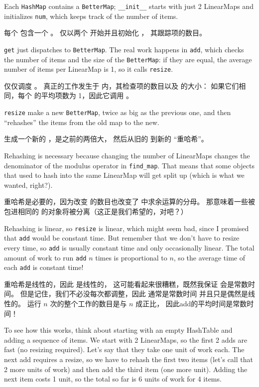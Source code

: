 Each {\tt HashMap} contains a {\tt BetterMap}; \verb"__init__" starts
with just 2 LinearMaps and initializes {\tt num}, which keeps track of
the number of items.

每个  包含一个 。
 仅以两个  开始并且初始化 ， 其跟踪项的数目。

{\tt get} just dispatches to {\tt BetterMap}.  The real work happens
in {\tt add}, which checks the number of items and the size of the
{\tt BetterMap}: if they are equal, the average number of items per
LinearMap is 1, so it calls {\tt resize}.

 仅仅调度 。 真正的工作发生于
 内，其检查项的数目以及  的大小：
如果它们相同，每个  的平均项数为 1，因此它调用 。

{\tt resize} make a new {\tt BetterMap}, twice as big as the previous
one, and then ``rehashes'' the items from the old map to the new.

 生成一个新的 ，是之前的两倍大，
然后从旧的  到新的 ``重哈希''。

Rehashing is necessary because changing the number of LinearMaps
changes the denominator of the modulus operator in
\verb"find_map".  That means that some objects that used
to hash into the same LinearMap will get split up (which is
what we wanted, right?).

重哈希是必要的，因为改变  的数目也改变了  中求余运算的分母。
那意味着一些被包进相同的  的对象将被分离（这正是我们希望的，对吧？）

Rehashing is linear, so
{\tt resize} is linear, which might seem bad, since I promised
that {\tt add} would be constant time.  But remember that
we don't have to resize every time, so {\tt add} is usually
constant time and only occasionally linear.  The total amount
of work to run {\tt add} $n$ times is proportional to $n$,
so the average time of each {\tt add} is constant time!

重哈希是线性的，因此  是线性的，
这可能看起来很糟糕，既然我保证  会是常数时间。
但是记住，我们不必没每次都调整，因此  通常是常数时间
并且只是偶然是线性的。 运行  $n$ 次的整个工作的数目是与 $n$ 成正比，
因此add的平均时间是常数时间！

To see how this works, think about starting with an empty
HashTable and adding a sequence of items.  We start with 2 LinearMaps,
so the first 2 adds are fast (no resizing required).  Let's
say that they take one unit of work each.  The next add
requires a resize, so we have to rehash the first two
items (let's call that 2 more units of work) and then
add the third item (one more unit).  Adding the next item
costs 1 unit, so the total so far is
6 units of work for 4 items.

